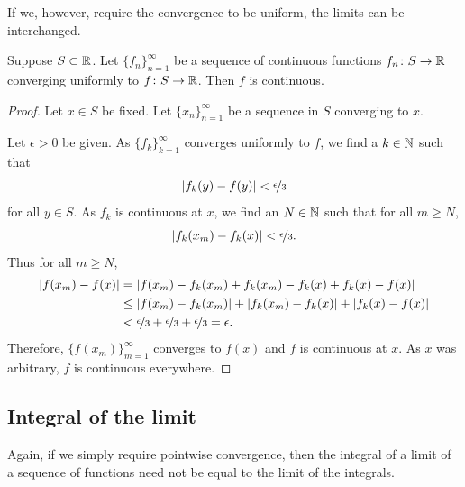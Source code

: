 If we, however, require the convergence to be uniform, the limits can
be interchanged.

\begin{thm}
Suppose $S \subset {\mathbb{R}}$.
Let $\{ f_n \}_{n=1}^\infty$ be 
a sequence of continuous functions $f_n \colon S \to {\mathbb{R}}$ converging
uniformly to  $f \colon S \to {\mathbb{R}}$.  Then $f$ is continuous.
\end{thm}

\begin{proof}
Let $x \in S$ be fixed.  Let $\{ x_n \}_{n=1}^\infty$ be a sequence in $S$
converging to $x$.

Let $\epsilon > 0$ be given.
As $\{ f_k \}_{k=1}^\infty$ converges uniformly to $f$, we find a $k \in {\mathbb{N}}$ such that
\begin{equation*}
\left\lvert {f_k(y)-f(y)} \right\rvert < \nicefrac{\epsilon}{3}
\end{equation*}
for all $y \in S$.  As $f_k$ is continuous at $x$,
we find an $N \in {\mathbb{N}}$ such that for all $m \geq N$,
\begin{equation*}
\left\lvert {f_k(x_m)-f_k(x)} \right\rvert < \nicefrac{\epsilon}{3} .
\end{equation*}
Thus for all
$m \geq N$,
\begin{equation*}
\begin{split}
\left\lvert {f(x_m)-f(x)} \right\rvert
& =
\left\lvert {f(x_m)-f_k(x_m)+f_k(x_m)-f_k(x)+f_k(x)-f(x)} \right\rvert
\\
& \leq
\left\lvert {f(x_m)-f_k(x_m)} \right\rvert+
\left\lvert {f_k(x_m)-f_k(x)} \right\rvert+
\left\lvert {f_k(x)-f(x)} \right\rvert
\\
& <
\nicefrac{\epsilon}{3} +
\nicefrac{\epsilon}{3} +
\nicefrac{\epsilon}{3} = \epsilon .
\end{split}
\end{equation*}
Therefore, $\bigl\{ f(x_m) \bigr\}_{m=1}^\infty$ converges to $f(x)$ and $f$ is continuous at
$x$.  As $x$ was arbitrary, $f$ is continuous everywhere.
\end{proof}

\subsection{Integral of the limit}

Again, if we simply require pointwise convergence, then the integral
of a limit of a sequence of functions need not be equal to the limit
of the integrals.

